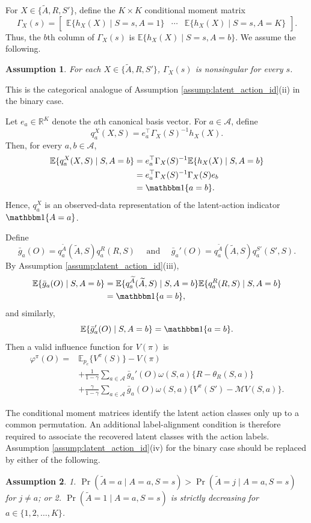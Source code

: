 \documentclass[12pt]{article}
\newcommand{\0}{\boldsymbol{0}}
\newtheorem{assumption}{Assumption}[section]
\begin{document}
For \(X\in\{\widetilde A,R,S'\}\), define the \(K\times K\)
conditional moment matrix
\[
\Gamma_X(s)=\begin{bmatrix}
\mathbb E\{h_X(X)\mid S=s,A=1\}&\cdots&\mathbb E\{h_X(X)\mid S=s,A=K\}
\end{bmatrix}.
\]
Thus, the \(b\)th column of \(\Gamma_X(s)\) is \(\mathbb E\{h_X(X)\mid S=s,A=b\}.\)
We assume the following. 
\begin{assumption}
For each \(X\in\{\widetilde A,R,S'\}\), \(\Gamma_X(s)\) is nonsingular for every \(s\).
\end{assumption}
This is the categorical analogue of Assumption \ref{assump:latent_action_id}(ii) in the binary case. 

Let \(e_a\in\mathbb R^K\) denote the \(a\)th canonical basis vector. For \(a\in\mathcal A\), define
\[
q_a^X(X,S)=e_a^\top\Gamma_X(S)^{-1}h_X(X).
\]
Then, for every \(a,b\in\mathcal A\),
\[
\begin{aligned}
\mathbb E\{q_a^X(X,S)\mid S,A=b\}
&=e_a^\top\Gamma_X(S)^{-1}\mathbb E\{h_X(X)\mid S,A=b\}\\
&=e_a^\top\Gamma_X(S)^{-1}\Gamma_X(S)e_b\\
&=\mathbbm 1\{a=b\}.
\end{aligned}
\]
Hence, \(q_a^X\) is an observed-data representation of the latent-action indicator \(\mathbbm 1\{A=a\}\).

Define
\[
\bar g_a(O)=q_a^{\widetilde A}(\widetilde A,S)q_a^R(R,S) \quad\text{ and }\quad
\bar g_a'(O)=q_a^{\widetilde A}(\widetilde A,S)q_a^{S'}(S',S).
\]
By Assumption \ref{assump:latent_action_id}(iii),
\[
\begin{aligned}
\mathbb E\{\bar g_a(O)\mid S,A=b\}
&=\mathbb E\{q_a^{\widetilde A}(\widetilde A,S)\mid S,A=b\}\mathbb E\{q_a^R(R,S)\mid S,A=b\}\\
&=\mathbbm 1\{a=b\},
\end{aligned}
\]
and similarly,
\[
\mathbb E\{\bar g_a'(O)\mid S,A=b\}=\mathbbm 1\{a=b\}.
\]
Then a valid influence function for \(V(\pi)\) is
\[
\begin{aligned}
\varphi^\pi(O)
={}&
\mathbb E_{p_e}\{V^\pi(S)\}-V(\pi)\\
&+\frac{1}{1-\gamma}\sum_{a\in\mathcal A}\bar g_a'(O)\omega(S,a)\{R-\theta_R(S,a)\}\\
&+\frac{\gamma}{1-\gamma}\sum_{a\in\mathcal A}\bar g_a(O)\omega(S,a)\{V^\pi(S')-\mathcal MV(S,a)\}.
\end{aligned}
\]


The conditional moment matrices identify the latent action classes only up to a common permutation. An additional label-alignment condition is therefore required to associate the recovered latent classes with the action labels. 
Assumption \ref{assump:latent_action_id}(iv) for the binary case should be replaced by either of the following.
\begin{assumption}
1. $\Pr(\widetilde{A}=a\mid A=a, S=s) > \Pr(\widetilde{A}=j\mid A=a, S=s)$ for $j\ne a$; or 
2. $\Pr(\widetilde{A}=1\mid A=a, S=s)$ is strictly decreasing for $a\in\{1,2,\ldots,K \}$.
\end{assumption}
\end{document}
